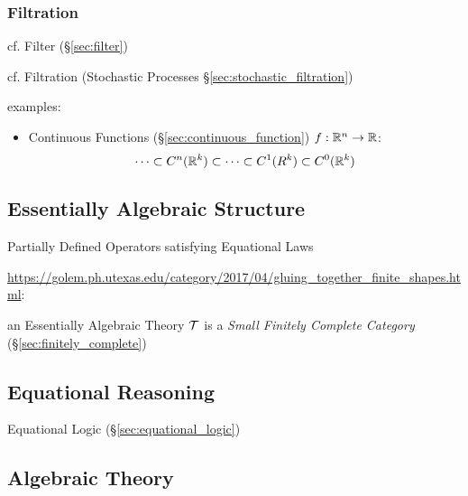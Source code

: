 \subsubsection{Filtration}\label{sec:filtration}

cf. Filter (\S\ref{sec:filter})

cf. Filtration (Stochastic Processes \S\ref{sec:stochastic_filtration})

examples:
\begin{itemize}
  \item Continuous Functions (\S\ref{sec:continuous_function})
    $f : \mathbb{R}^n \rightarrow \mathbb{R}$:
    \[
      \cdots \subset C^n(\mathbb{R}^k) \subset \cdots \subset C^1(R^k) \subset
        C^0(\mathbb{R}^k)
    \]
\end{itemize}



\subsection{Essentially Algebraic Structure}
\label{sec:essentially_algebraic}

Partially Defined Operators satisfying Equational Laws

\url{https://golem.ph.utexas.edu/category/2017/04/gluing_together_finite_shapes.html}:

an Essentially Algebraic Theory $\mathcal{T}$ is a \emph{Small Finitely Complete
  Category} (\S\ref{sec:finitely_complete})



\subsection{Equational Reasoning}\label{sec:equational_reasoning}

Equational Logic (\S\ref{sec:equational_logic})



\subsection{Algebraic Theory}\label{sec:algebraic_theory}


